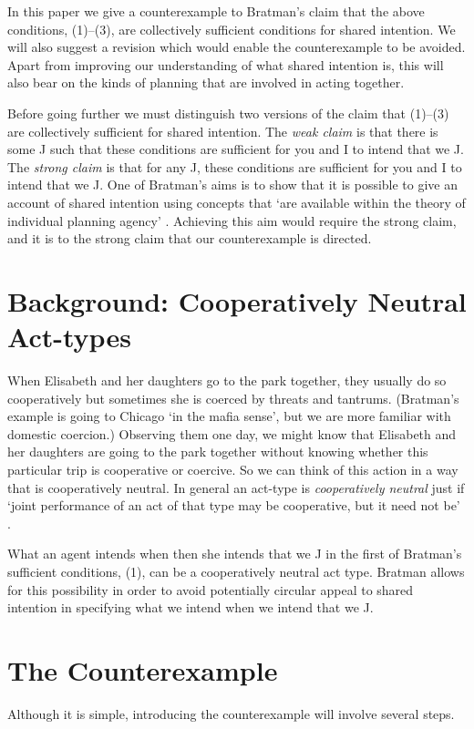 \documentclass[12pt,\papersize]{extarticle}
\begin{document}
In this paper we give a counterexample to Bratman's  claim that the above conditions, (1)--(3), are collectively sufficient conditions for shared intention. 
We will also suggest a revision which would enable the counterexample to be avoided.
Apart from improving our understanding of what shared intention is, 
this will also bear on the kinds of planning that are involved in acting together.

Before going further we must distinguish two versions of the claim that (1)--(3) are collectively sufficient for shared intention.
The \emph{weak claim} is that there is some J such that these conditions are sufficient for you and I to intend that we J.
The \emph{strong claim} is that for any J, these conditions are sufficient for you and I to intend that we J.
One of Bratman's aims is to show that it is possible to give an account of shared intention using concepts that `are available within the theory of individual planning agency' \citep[p.\ 163]{Bratman:2009lv}.  
Achieving this aim would require the strong claim, and it is to the strong claim that our counterexample is directed. 


\section{Background: Cooperatively Neutral Act-types}
When Elisabeth and her daughters go to the park together, 
	they usually do so cooperatively 
	but sometimes she is coerced by threats and tantrums.  
(Bratman's example is going to Chicago `in the mafia sense', but we are  more familiar with domestic coercion.)
Observing them one day, we might 
	know that Elisabeth and her daughters are going to the park together 
	without knowing whether this particular trip is cooperative or coercive.
So we can think of this action in a way that is cooperatively neutral.
In general an act-type is \emph{cooperatively neutral} just if `joint performance of an act of that type may be cooperative, but it need not be' \citep[p.\ 330]{Bratman:1992mi}. 

What an agent intends when then she intends that we J in the first of Bratman's sufficient conditions, (1), can be a cooperatively neutral act type. 
Bratman allows for this possibility in order to avoid potentially circular appeal to shared intention in specifying what we intend when we intend that we J.




\section{The Counterexample}
Although it is simple, introducing the counterexample will involve several steps.
\end{document}
